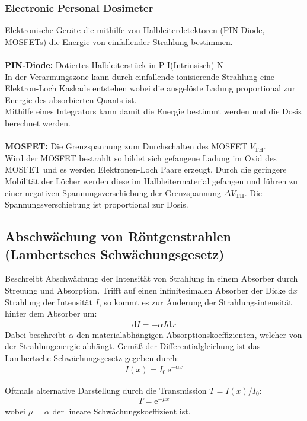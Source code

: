 \documentclass[11pt, a4paper]{article}
\numberwithin{equation}{section}
\begin{document}
\subsubsection{Electronic Personal Dosimeter}
Elektronische Geräte die mithilfe von Halbleiterdetektoren (PIN-Diode, MOSFETs) die Energie von einfallender Strahlung bestimmen.\\
\\
\textbf{PIN-Diode:} Dotiertes Halbleiterstück in P-I(Intrinsisch)-N\\
In der Verarmungszone kann durch einfallende ionisierende Strahlung eine Elektron-Loch Kaskade entstehen wobei die ausgelöste Ladung proportional zur Energie des absorbierten Quants ist.\\
Mithilfe eines Integrators kann damit die Energie bestimmt werden und die Dosis berechnet werden.\\
\\
\textbf{MOSFET:} Die Grenzspannung zum Durchschalten des MOSFET $V_\mathrm{TH}$.\\
Wird der MOSFET bestrahlt so bildet sich gefangene Ladung im Oxid des MOSFET und es werden Elektronen-Loch Paare erzeugt.
Durch die geringere Mobilität der Löcher werden diese im Halbleitermaterial gefangen und führen zu einer negativen Spannungsverschiebung der Grenzspannung $\Delta V_\mathrm{TH}$.
Die Spannungsverschiebung ist proportional zur Dosis.


\subsection{Abschwächung von Röntgenstrahlen (Lambertsches Schwächungsgesetz)}
Beschreibt Abschwächung der Intensität von Strahlung in einem Absorber durch Streuung und Absorption.
Trifft auf einen infinitesimalen Absorber der Dicke $\mathrm{d} x$ Strahlung der Intensität $I$, so kommt es zur Änderung der Strahlungsintensität hinter dem Absorber um:
\begin{align}
	\mathrm{d} I = - \alpha I \mathrm{d} x
\end{align}
Dabei beschreibt $\alpha$ den materialabhängigen Absorptionskoeffizienten, welcher von der Strahlungenergie abhängt.
Gemäß der Differentialgleichung ist das Lambertsche Schwächungsgesetz gegeben durch:
\begin{align}
	I(x) = I_0 \, \mathrm{e}^{-\alpha x}
\end{align}

Oftmals alternative Darstellung durch die Transmission $T = I(x)/I_0$:
\begin{align}
	T = \mathrm{e}^{-\mu x}
\end{align}
wobei $\mu = \alpha$ der lineare Schwächungskoeffizient ist.
\end{document}
